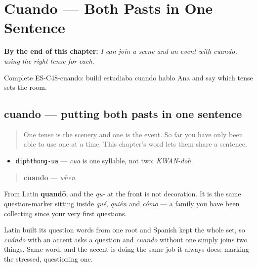 
\chapter{Cuando --- Both Pasts in One Sentence}
\label{ch:cuando}

\begin{chapteropening}
\textbf{By the end of this chapter:} \emph{I can join a scene and an event with cuando, using the right tense for each.}

Complete ES-C48-cuando: build estudiaba cuando hablo Ana and say which tense sets the room.
\end{chapteropening}

\section[cuando]{cuando — putting both pasts in one sentence}

\label{lesson:ES-C48-cuando}



\begin{quote}
One tense is the scenery and one is the event. So far you have only been able to use one at a time. This chapter's word lets them share a sentence.
\end{quote}

\begin{sounds}
\begin{itemize}
\raggedright
  \item \texttt{diphthong-ua} — \emph{cua} is one syllable, not two: \emph{KWAN-doh}.
\end{itemize}
\end{sounds}

\begin{cousinweb}
\begin{quote}
\textbf{cuando} — \emph{when}.
\end{quote}

From Latin \textbf{quandō}, and the \emph{qu-} at the front is not decoration. It is the same question-marker sitting inside \emph{qué}, \emph{quién} and \emph{cómo} — a family you have been collecting since your very first questions.

Latin built its question words from one root and Spanish kept the whole set, so \emph{cuándo} with an accent asks a question and \emph{cuando} without one simply joins two things. Same word, and the accent is doing the same job it always does: marking the stressed, questioning one.
\end{cousinweb}

